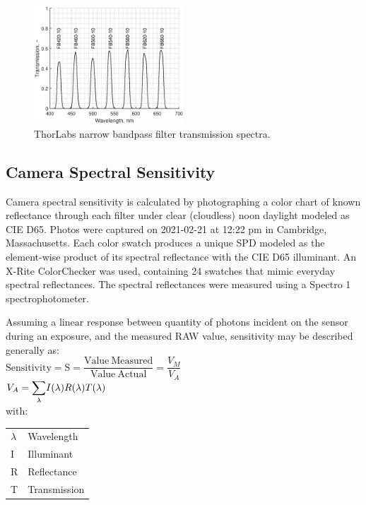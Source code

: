 \documentclass[twocolumn,10pt]{asme2ej}
\newcommand{\id}{\hspace{6 mm}}
\begin{document}
\begin{figure}
\centering
\includegraphics[width=0.5\textwidth]{thorlabs_filter_transmission_spectra.eps}
\caption{ThorLabs narrow bandpass filter transmission spectra.}
\label{thorlabs_filter_transmission_spectra}
\end{figure}

\subsection{Camera Spectral Sensitivity}

\label{Camera_Spectral_Sensitivity}

Camera spectral sensitivity is calculated by photographing a color chart of known reflectance through each filter under clear (cloudless) noon daylight modeled as CIE D65. Photos were captured on 2021-02-21 at 12:22 pm in Cambridge, Massachusetts. Each color swatch produces a unique SPD modeled as the element-wise product of its spectral reflectance with the CIE D65 illuminant. An X-Rite ColorChecker was used, containing 24 swatches that mimic everyday spectral reflectances. The spectral reflectances were measured using a Spectro 1 spectrophotometer.

\id Assuming a linear response between quantity of photons incident on the sensor during an exposure, and the measured RAW value, sensitivity may be described generally as:\\

$\mathrm{ Sensitivity = S = \dfrac{Value \ Measured}{Value \ Actual} } = \dfrac{V_M}{V_A}$ \\

$V_A = \mathlarger{\sum_{\lambda}} I(\lambda) R(\lambda) T(\lambda)$ \\

with: \\

\begin{tabular}{l | l}
$\lambda$ & Wavelength \\
I & Illuminant\\
R & Reflectance \\
T & Transmission \\
\end{tabular} \\
\end{document}
